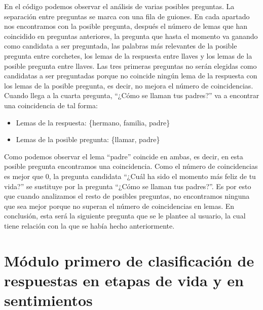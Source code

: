 En el código podemos observar el análisis de varias posibles preguntas. La separación entre preguntas se marca con una fila de guiones. En cada apartado nos encontramos con la posible pregunta, después el número de lemas que han coincidido en preguntas anteriores, la pregunta que hasta el momento va ganando como candidata a ser preguntada, las palabras más relevantes de la posible pregunta entre corchetes, los lemas de la respuesta entre llaves y los lemas de la posible pregunta entre llaves. Las tres primeras preguntas no serán elegidas como candidatas a ser preguntadas porque no coincide ningún lema de la respuesta con los lemas de la posible pregunta, es decir, no mejora el número de coincidencias. Cuando llega a la cuarta pregunta, ``¿Cómo se llaman tus padres?'' va a encontrar una coincidencia de tal forma:

\begin{itemize}
	\item[] Lemas de la respuesta: \hspace{2cm} \{hermano, familia, padre\} 
	\item[] Lemas de la posible pregunta: \hspace{0.8cm} \{llamar, padre\}
\end{itemize}

Como podemos observar el lema ``padre'' coincide en ambas, es decir, en esta posible pregunta encontramos una coincidencia. Como el número de coincidencias es mejor que 0, la pregunta candidata ``¿Cuál ha sido el momento más feliz de tu vida?'' se sustituye por la pregunta ``¿Cómo se llaman tus padres?''. Es por esto que cuando analizamos el resto de posibles preguntas, no encontramos ninguna que sea mejor porque no superan el número de coincidencias en lemas. En conclusión, esta será la siguiente pregunta que se le plantee al usuario, la cual tiene relación con la que se había hecho anteriormente. 

\section{Módulo primero de clasificación de respuestas en etapas de vida y en sentimientos}



